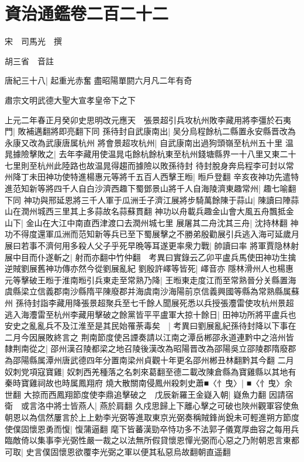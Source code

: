 \section{資治通鑑卷二百二十二}
宋　司馬光　撰

胡三省　音註

唐紀三十八|{
	起重光赤奮盡昭陽單閼六月凡二年有奇}


肅宗文明武德大聖大宣孝皇帝下之下

上元二年春正月癸卯史思明改元應天　張景超引兵攻杭州敗李藏用將李彊於石夷門|{
	敗補邁翻將即亮翻下同}
孫待封自武康南出|{
	吴分烏程餘杭二縣置永安縣晋改為永康又改為武康唐属杭州}
將會景超攻杭州|{
	自武康南出過狗頭嶺至杭州五十里}
温晁據險擊敗之|{
	去年李藏用使温晁屯餘杭餘杭東至杭州錢塘縣界一十八里又東二十七里則至杭州此陸路也故温晁得趨而據險以敗孫待封}
待封脫身奔烏程李可封以常州降丁未田神功使特進楊惠元等將千五百人西擊王暅|{
	暅戶登翻}
辛亥夜神功先遣特進范知新等將四千人自白沙濟西趣下蜀鄧景山將千人自海陵濟東趣常州|{
	趣七喻翻下同}
神功與邢延恩將三千人軍于瓜洲壬子濟江展將步騎萬餘陳于蒜山|{
	陳讀曰陣蒜山在潤州城西三里其上多蒜故名蒜蘇貫翻}
神功以舟載兵趣金山會大風五舟飄抵金山下|{
	金山在大江中南直西津渡口去潤州城七里}
展屠其二舟沈其三舟|{
	沈持林翻}
神功不得度還軍瓜洲而范知新等兵已至下蜀展擊之不勝弟殷勸展引兵逃入海可延歲月展曰若事不濟何用多殺人父子乎死早晩等耳遂更率衆力戰|{
	帥讀曰率}
將軍賈隐林射展中目而仆遂斬之|{
	射而亦翻中竹仲翻　考異曰實錄云乙卯平盧兵馬使田神功生擒逆賊劉展舊神功傳亦然今從劉展亂紀}
劉殷許嶧等皆死|{
	嶧音亦}
隱林滑州人也楊惠元等擊破王暅于淮南暅引兵東走至常熟乃降|{
	王暅東走度江而至常熟晉分关縣置海虞縣梁立信義郡南沙縣隋平陳廢郡并海虞南沙海陽前京信義興國等縣為常熟縣属蘇州}
孫待封詣李藏用降張景超聚兵至七千餘人聞展死悉以兵授張灋雷使攻杭州景超逃入海灋雷至杭州李藏用擊破之餘黨皆平平盧軍大掠十餘日|{
	田神功所將平盧兵也}
安史之亂亂兵不及江淮至是其民始罹荼毒矣　|{
	考異曰劉展亂紀孫待封降以下事在二月今因展敗終言之}
荆南節度使呂諲奏請以江南之潭岳郴邵永道連黔中之涪州皆隸荆南從之|{
	邵州漢召陵都梁之地召陵後漢改為昭陽晋改為邵陽吳立邵陵郡隋廢郡為邵陽縣属潭州唐武德四年分置南梁州貞觀十年更名邵州郴丑林翻黔其今翻}
二月奴刺党項寇寶雞|{
	奴刺西羌種落之名刺來葛翻至德二載改陳倉縣為寶雞縣以其地有秦時寶雞祠故也時属鳳翔府}
燒大散關南侵鳳州殺刺史蕭■〈忄曳〉|{
	■〈忄曳〉余世翻}
大掠而西鳳翔節度使李鼎追擊破之　戊辰新羅王金嶷入朝|{
	嶷魚力翻}
因請宿衛　或言洛中將士皆燕人|{
	燕於肩翻}
久戍思歸上下離心擊之可破也陜州觀軍容使魚朝恩以為信然屢言於上上勅李光弼等進取東京光弼奏稱賊鋒尚銳未可輕進朔方節度使僕固懷恩勇而愎|{
	愎蒲逼翻}
麾下皆蕃漢勁卒恃功多不法郭子儀寛厚曲容之每用兵臨敵倚以集事李光弼性嚴一裁之以法無所假貸懷恩憚光弼而心惡之乃附朝恩言東都可取|{
	史言僕固懷恩欲覆李光弼之軍以便其私惡烏故翻朝直遥翻}
